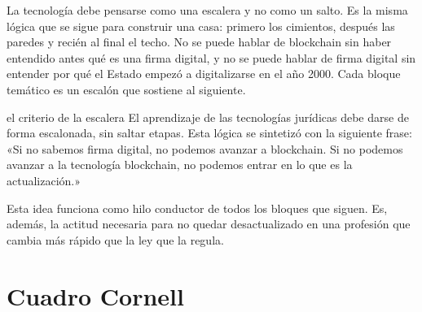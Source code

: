 \documentclass[12pt,oneside]{book}
\begin{document}
La tecnología debe pensarse como una escalera y no como un salto. Es la misma lógica que se sigue para construir una casa: primero los cimientos, después las paredes y recién al final el techo. No se puede hablar de blockchain sin haber entendido antes qué es una firma digital, y no se puede hablar de firma digital sin entender por qué el Estado empezó a digitalizarse en el año 2000. Cada bloque temático es un escalón que sostiene al siguiente.

\begin{example}{el criterio de la escalera}
El aprendizaje de las tecnologías jurídicas debe darse de forma escalonada, sin saltar etapas. Esta lógica se sintetizó con la siguiente frase: «Si no sabemos firma digital, no podemos avanzar a blockchain. Si no podemos avanzar a la tecnología blockchain, no podemos entrar en lo que es la actualización.»

Esta idea funciona como hilo conductor de todos los bloques que siguen. Es, además, la actitud necesaria para no quedar desactualizado en una profesión que cambia más rápido que la ley que la regula.
\end{example}

\section{Cuadro Cornell}
\end{document}
